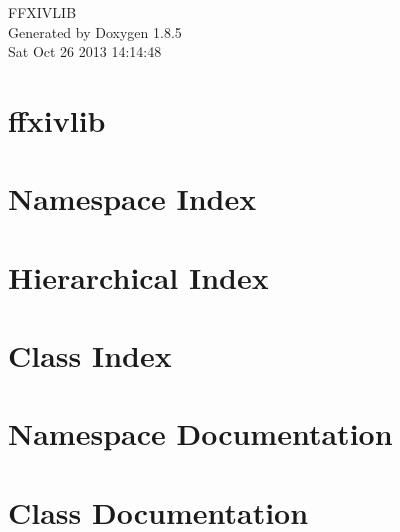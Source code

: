 \documentclass[twoside]{book}
\newcommand{\clearemptydoublepage}{%
  \newpage{\pagestyle{empty}\cleardoublepage}%
}
\begin{document}
\hypersetup{pageanchor=false}
\begin{titlepage}
\vspace*{7cm}
\begin{center}%
{\Large F\-F\-X\-I\-V\-L\-I\-B }\\
\vspace*{1cm}
{\large Generated by Doxygen 1.8.5}\\
\vspace*{0.5cm}
{\small Sat Oct 26 2013 14:14:48}\\
\end{center}
\end{titlepage}
\clearemptydoublepage
\tableofcontents
\clearemptydoublepage
{}
\hypersetup{pageanchor=true}

\chapter{ffxivlib}
\label{md__r_e_a_d_m_e}
\hypertarget{md__r_e_a_d_m_e}{}

\chapter{Namespace Index}

\chapter{Hierarchical Index}

\chapter{Class Index}

\chapter{Namespace Documentation}



\chapter{Class Documentation}














\newpage
{}
{}
\printindex
\end{document}
